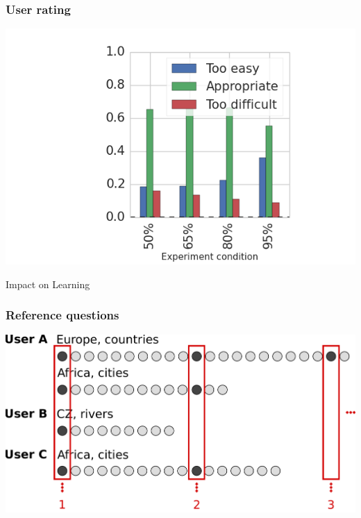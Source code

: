 \documentclass[bigger]{beamer}
\begin{document}
\begin{frame}
  \frametitle{User rating}
  \includegraphics[width=\textwidth]{img/rating_by_divider_ab_school_divider_target_difficulty_answers}
\end{frame}

\begin{frame}
	\begin{center}
    {\Huge Impact on Learning} 
	\end{center}
\end{frame}


\begin{frame}
  \frametitle{Reference questions}
  \includegraphics[width=\textwidth]{img/reference_answers_learning}
\end{frame}
\end{document}
